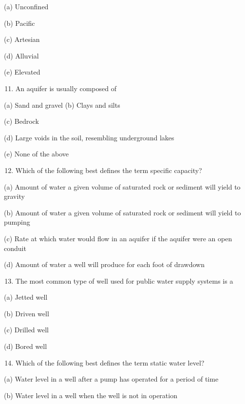 \documentclass[10pt]{article}
\begin{document}
(a) Unconfined

(b) Pacific

(c) Artesian

(d) Alluvial

(e) Elevated

\begin{enumerate}
  \setcounter{enumi}{10}
  \item An aquifer is usually composed of
\end{enumerate}

(a) Sand and gravel (b) Clays and silts

(c) Bedrock

(d) Large voids in the soil, resembling underground lakes

(e) None of the above

\begin{enumerate}
  \setcounter{enumi}{11}
  \item Which of the following best defines the term specific capacity?
\end{enumerate}

(a) Amount of water a given volume of saturated rock or sediment will yield to gravity

(b) Amount of water a given volume of saturated rock or sediment will yield to pumping

(c) Rate at which water would flow in an aquifer if the aquifer were an open conduit

(d) Amount of water a well will produce for each foot of drawdown

\begin{enumerate}
  \setcounter{enumi}{12}
  \item The most common type of well used for public water supply systems is a
\end{enumerate}

(a) Jetted well

(b) Driven well

(c) Drilled well

(d) Bored well

\begin{enumerate}
  \setcounter{enumi}{13}
  \item Which of the following best defines the term static water level?
\end{enumerate}

(a) Water level in a well after a pump has operated for a period of time

(b) Water level in a well when the well is not in operation
\end{document}
